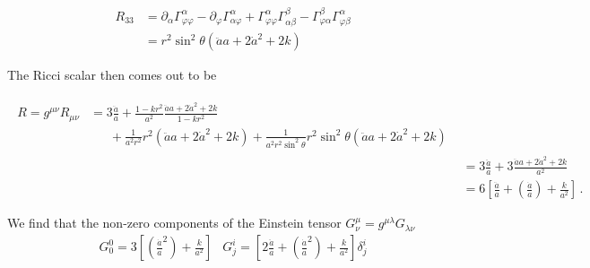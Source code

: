 \begin{subequations}
    \begin{align}
        R_{33} &= \partial_{\alpha } \Gamma^{\alpha }_{\varphi \varphi } - \partial_{\varphi } \Gamma^{\alpha }_{\alpha \varphi } + \Gamma^{\alpha }_{\varphi \varphi } \Gamma^{\beta }_{\alpha \beta } - \Gamma^{\beta }_{\varphi \alpha } \Gamma^{\alpha }_{\varphi \beta }  \\
        &= r^2 \sin^2\theta (\ddot{a} a + 2 \dot{a}^2 + 2k) 
    \end{align}
\end{subequations}


The Ricci scalar then comes out to be 

\begin{subequations}
    \begin{align}
        \begin{split}
            R = g^{\mu \nu } R_{\mu \nu } 
            &= 3 \frac{\ddot{a}}{a} 
            + \frac{1-kr^2}{a^2} \frac{\ddot{a}
             a + 2 \dot{a}^2 + 2k}{1 - kr^2} \\
             &\phantom{=}\ 
            + \frac{1}{a^2r^2} r^2 (\ddot{a} a + 2 \dot{a}^2 + 2k)
            + \frac{1}{a^2r^2 \sin^2\theta }
            r^2 \sin^2\theta  (\ddot{a} a + 2 \dot{a}^2 + 2k) 
        \end{split}
        \\
        &= 3 \frac{\ddot{a}}{a} + 3 \frac{\ddot{a}a + 2 \dot{a}^2 + 2k}{a^2}
        \\
        &= 6 \left[\frac{\ddot{a}}{a} + (\frac{\dot{a}}{a}) + \frac{k}{a^2}\right]
        \,.
    \end{align}
\end{subequations}

We find that the non-zero components of the Einstein tensor $G^{\mu}_{\nu} = g^{\mu \lambda}G_{\lambda \nu }$
\begin{subequations}
    \begin{align}
        G^{0}_{0} = 3 \left[\left(\frac{\dot{a}}{a}^2\right) + \frac{k}{a^2}\right]\label{eq:1.18a}
    \end{align}
    \begin{align}
        G^{i}_{j} =  \left[2\frac{\ddot{a}}{a} + \left(\frac{\dot{a}}{a}^2\right) + \frac{k}{a^2}\right]\delta^{i}_{j}\label{eq:1.18b}
    \end{align}
\end{subequations}
\hspace{0.5cm}\\


